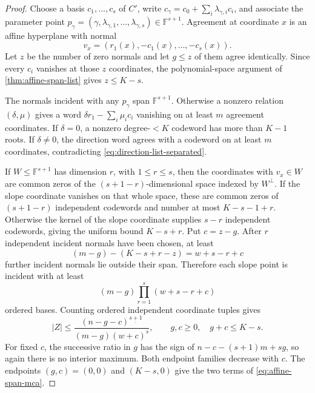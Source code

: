 \documentclass[11pt,a4paper]{amsart}
\numberwithin{equation}{section}
\theoremstyle{remark}
\newcommand{\F}{\mathbb F}\newcommand{\B}{\mathbb B}\newcommand{\K}{\mathbb K}\newcommand{\Z}{\mathbb Z}
\begin{document}
\begin{proof}
Choose a basis \(c_1,\ldots,c_s\) of \(C'\), write
\(c_\gamma=c_0+\sum_i\lambda_{\gamma,i}c_i\), and associate the parameter
point
\(p_\gamma=(\gamma,\lambda_{\gamma,1},\ldots,\lambda_{\gamma,s})\in
\F^{s+1}\).  Agreement at coordinate \(x\) is an affine hyperplane with
normal
\[
 v_x=(r_1(x),-c_1(x),\ldots,-c_s(x)).
\]
Let \(z\) be the number of zero normals and let \(g\le z\) of them agree
identically.  Since every \(c_i\) vanishes at those \(z\) coordinates,
the polynomial-space argument of \cref{thm:affine-span-list} gives
\(z\le K-s\).

The normals incident with any \(p_\gamma\) span \(\F^{s+1}\).  Otherwise
a nonzero relation \((\delta,\mu)\) gives a word
\(\delta r_1-\sum_i\mu_i c_i\) vanishing on at least \(m\) agreement
coordinates.  If \(\delta=0\), a nonzero degree-\(<K\) codeword has more
than \(K-1\) roots.  If \(\delta\ne0\), the direction word agrees with a
codeword on at least \(m\) coordinates, contradicting
\eqref{eq:direction-list-separated}.

If \(W\le\F^{s+1}\) has dimension \(r\), with \(1\le r\le s\), then the
coordinates with \(v_x\in W\) are common zeros of the
\((s+1-r)\)-dimensional space indexed by \(W^\perp\).  If the slope
coordinate vanishes on that whole space, these are common zeros of
\((s+1-r)\) independent codewords and number at most
\(K-s-1+r\).  Otherwise the kernel of the slope coordinate supplies
\(s-r\) independent codewords, giving the uniform bound
\(K-s+r\).  Put \(c=z-g\).  After \(r\) independent incident normals
have been chosen, at least
\[
 (m-g)-(K-s+r-z)=w+s-r+c
\]
further incident normals lie outside their span.  Therefore each slope
point is incident with at least
\[
 (m-g)\prod_{r=1}^{s}(w+s-r+c)
\]
ordered bases.
Counting ordered independent coordinate tuples gives
\[
 |Z|\le
 \frac{(n-g-c)^{\underline{s+1}}}
 {(m-g)(w+c)^{\overline s}},
 \qquad g,c\ge0,\quad g+c\le K-s.
\]
For fixed \(c\), the successive ratio in \(g\) has the sign of
\(n-c-(s+1)m+sg\), so again there is no interior maximum.  Both endpoint
families decrease with \(c\).  The endpoints \((g,c)=(0,0)\) and
\((K-s,0)\) give the two terms of \eqref{eq:affine-span-mca}.
\end{proof}
\end{document}
